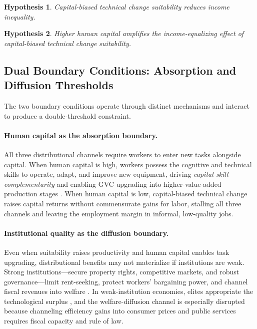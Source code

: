 \documentclass[12pt]{article}
\newtheorem{hypothesis}{Hypothesis}
\begin{document}
\begin{hypothesis}
Capital-biased technical change suitability reduces income inequality.
\end{hypothesis}

\begin{hypothesis}
Higher human capital amplifies the income-equalizing effect of
capital-biased technical change suitability.
\end{hypothesis}

\subsection{Dual Boundary Conditions: Absorption and Diffusion Thresholds}

The two boundary conditions operate through distinct mechanisms
and interact to produce a double-threshold constraint.

\paragraph{Human capital as the absorption boundary.}
All three distributional channels require workers to enter new tasks
alongside capital.
When human capital is high, workers possess the cognitive and
technical skills to operate, adapt, and improve new equipment,
driving \emph{capital-skill complementarity} \citep{krusell2000capitalskill}
and enabling GVC upgrading into higher-value-added production stages
\citep{goldin2009race}.
When human capital is low, capital-biased technical change raises
capital returns without commensurate gains for labor, stalling all
three channels and leaving the employment margin in informal,
low-quality jobs.

\paragraph{Institutional quality as the diffusion boundary.}
Even when suitability raises productivity and human capital enables
task upgrading, distributional benefits may not materialize if
institutions are weak.
Strong institutions---secure property rights, competitive markets,
and robust governance---limit rent-seeking, protect workers'
bargaining power, and channel fiscal revenues into welfare
\citep{acemoglu2005institutions, hall1999why}.
In weak-institution economies, elites appropriate the technological
surplus \citep{north1990institutions}, and the welfare-diffusion
channel is especially disrupted because channeling efficiency
gains into consumer prices and public services requires fiscal
capacity and rule of law.
\end{document}
